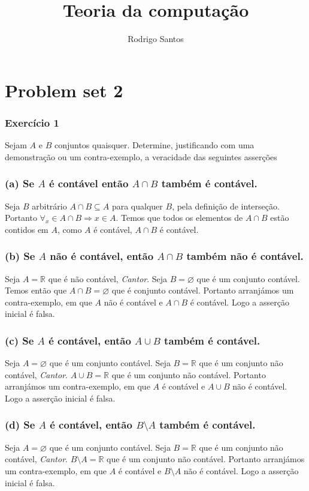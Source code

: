 \documentclass{article}
\title{Teoria da computação}
\author{Rodrigo Santos}
\begin{document}
\maketitle

\section*{Problem set 2}
\subsubsection*{Exercício 1}
Sejam $A$ e $B$ conjuntos quaisquer. Determine, justificando com uma demonstração ou um contra-exemplo, a veracidade das seguintes asserções

\subsubsection*{(a) Se $A$ é contável então $A \cap B$ também é contável.}
Seja $B$ arbitrário $A \cap B \subseteq A$ para qualquer $B$, pela definição de interseção. Portanto $\forall_x \in A \cap B \Rightarrow x \in A$. Temos que todos os elementos de $A \cap B$ estão contidos em $A$, como $A$ é contável, $A \cap B$ é contável.

\subsubsection*{(b) Se $A$ não é contável, então $A \cap B$ também não é contável.}
Seja $A = \mathbb{R}$ que é não contável, \textit{Cantor}. Seja $B = \varnothing$ que é um conjunto contável. Temos então que $A \cap B = \varnothing$ que é conjunto contável. Portanto arranjámos um contra-exemplo, em que $A$ não é contável e $A \cap B$ é contável. Logo a asserção inicial é falsa.

\subsubsection*{(c) Se $A$ é contável, então $A \cup B$ também é contável.}
Seja $A = \varnothing$ que é um conjunto contável. Seja $B = \mathbb{R}$ que é um conjunto não contável, \textit{Cantor}. $A \cup B = \mathbb{R}$ que é um conjunto não contável. Portanto arranjámos um contra-exemplo, em que $A$ é contável e $A \cup B$ não é contável. Logo a asserção inicial é falsa.

\subsubsection*{(d) Se $A$ é contável, então $B \setminus A$ também é contável.}
Seja $A = \varnothing$ que é um conjunto contável. Seja $B = \mathbb{R}$ que é um conjunto não contável, \textit{Cantor}. $B \setminus A = \mathbb{R}$ que é um conjunto não contável. Portanto arranjámos um contra-exemplo, em que $A$ é contável e $B \setminus A$ não é contável. Logo a asserção inicial é falsa.
\end{document}
